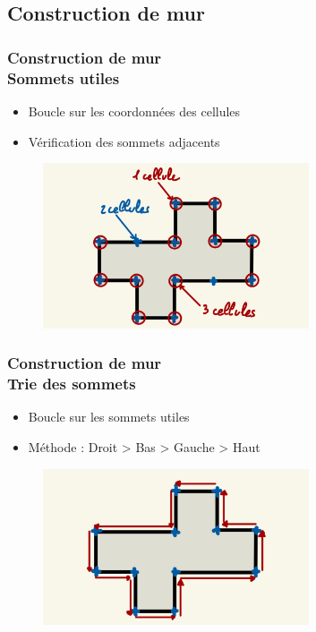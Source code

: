 \documentclass{beamer}
\begin{document}
\subsection{Construction de mur}

\begin{frame}
    \frametitle{Construction de mur \\
                \small Sommets utiles}
    \begin{block}{}
        \begin{itemize}
            \item Boucle sur les coordonnées des cellules
            \item Vérification des sommets adjacents
        \end{itemize}
    \end{block}
    \begin{figure}
        \centering
        \includegraphics[width=0.7\textwidth]{images/sommets_utiles.jpg}
    \end{figure}
\end{frame}

\begin{frame}
    \frametitle{Construction de mur \\
                \small Trie des sommets}
    \begin{block}{}
        \begin{itemize}
            \item Boucle sur les sommets utiles
            \item Méthode : Droit > Bas > Gauche > Haut
        \end{itemize}
    \end{block}
    \begin{figure}
        \centering
        \includegraphics[width=0.7\textwidth]{images/tri_sommet.jpg}
    \end{figure}
\end{frame}
\end{document}
